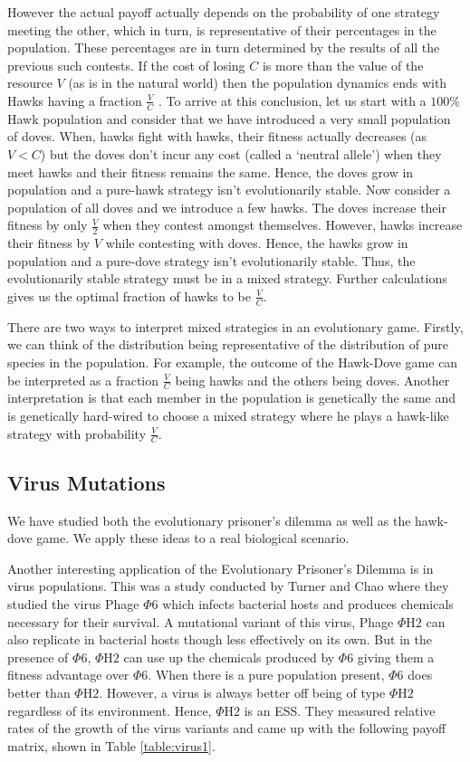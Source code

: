 \documentclass{article}
\theoremstyle{definition}
\begin{document}
However the actual payoff actually depends on the probability of one strategy meeting the other, which in turn, is representative of their percentages in the population. These percentages are in turn determined by the results of all the previous such contests. If the cost of losing $C$ is more than the value of the resource $V$ (as is in the natural world) then the population dynamics ends with Hawks having a fraction $\frac{V}{C}$ . To arrive at this conclusion, let us start with a $100\%$ Hawk population and consider that we have introduced a very small population of doves. When, hawks fight with hawks, their fitness actually decreases (as $V < C$) but the doves don't incur any cost (called a `neutral allele') when they meet hawks and their fitness remains the same. Hence, the doves grow in population and a pure-hawk strategy isn't evolutionarily stable. Now consider a population of all doves and we introduce a few hawks. The doves increase their fitness by only $\frac{V}{2}$ when they contest amongst themselves. However, hawks increase their fitness by $V$ while contesting with doves. Hence, the hawks grow in population and a pure-dove strategy isn't evolutionarily stable. Thus, the evolutionarily stable strategy must be in a mixed strategy. Further calculations gives us the optimal fraction of hawks to be $\frac{V}{C}$. \medskip

There are two ways to interpret mixed strategies in an evolutionary game. Firstly, we can think of the distribution being representative of the distribution of pure species in the population. For example, the outcome of the Hawk-Dove game can be interpreted as a fraction $\frac{V}{C}$ being hawks and the others being doves. Another interpretation is that each member in the population is genetically the same and is genetically hard-wired to choose a mixed strategy where he plays a hawk-like strategy with probability $\frac{V}{C}$.

\subsection{Virus Mutations}

We have studied both the evolutionary prisoner's dilemma as well as the hawk-dove game. We apply these ideas to a real biological scenario. \medskip

Another interesting application of the Evolutionary Prisoner's Dilemma is in virus populations. This was a study conducted by Turner and Chao where they studied the virus Phage $\Phi6$ which infects bacterial hosts and produces chemicals necessary for their survival. A mutational variant of this virus, Phage $\Phi \text{H}2$ can also replicate in bacterial hosts though less effectively on its own. But in the presence of $\Phi6$, $\Phi \text{H}2$ can use up the chemicals produced by $\Phi6$ giving them a fitness advantage over $\Phi6$. When there is a pure population present, $\Phi6$ does better than $\Phi \text{H}2$. However, a virus is always better off being of type $\Phi \text{H}2$ regardless of its environment. Hence, $\Phi \text{H} 2$ is an ESS. They measured relative rates of the growth of the virus variants and came up with the following payoff matrix, shown in Table \ref{table:virus1}.
\end{document}
